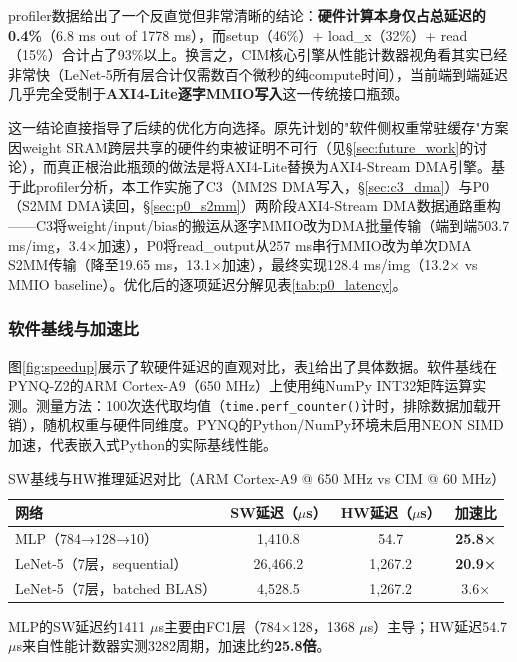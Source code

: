 \documentclass[12pt, a4paper]{article}
\begin{document}
profiler数据给出了一个反直觉但非常清晰的结论：\textbf{硬件计算本身仅占总延迟的0.4\%}（6.8 ms out of 1778 ms），而setup（46\%）+ load\_x（32\%）+ read（15\%）合计占了93\%以上。换言之，CIM核心引擎从性能计数器视角看其实已经非常快（LeNet-5所有层合计仅需数百个微秒的纯compute时间），当前端到端延迟几乎完全受制于\textbf{AXI4-Lite逐字MMIO写入}这一传统接口瓶颈。

这一结论直接指导了后续的优化方向选择。原先计划的"软件侧权重常驻缓存"方案因weight SRAM跨层共享的硬件约束被证明不可行（见§\ref{sec:future_work}的讨论），而真正根治此瓶颈的做法是将AXI4-Lite替换为AXI4-Stream DMA引擎。基于此profiler分析，本工作实施了C3（MM2S DMA写入，§\ref{sec:c3_dma}）与P0（S2MM DMA读回，§\ref{sec:p0_s2mm}）两阶段AXI4-Stream DMA数据通路重构——C3将weight/input/bias的搬运从逐字MMIO改为DMA批量传输（端到端503.7 ms/img，3.4×加速），P0将read\_output从257 ms串行MMIO改为单次DMA S2MM传输（降至19.65 ms，13.1×加速），最终实现128.4 ms/img（13.2× vs MMIO baseline）。优化后的逐项延迟分解见表\ref{tab:p0_latency}。

\subsubsection{软件基线与加速比}

图\ref{fig:speedup}展示了软硬件延迟的直观对比，表\ref{tab:speedup}给出了具体数据。软件基线在PYNQ-Z2的ARM Cortex-A9（650 MHz）上使用纯NumPy INT32矩阵运算实测。测量方法：100次迭代取均值（\texttt{time.perf\_counter()}计时，排除数据加载开销），随机权重与硬件同维度。PYNQ的Python/NumPy环境未启用NEON SIMD加速，代表嵌入式Python的实际基线性能。

\begin{table}[H]
    \centering
    \caption{SW基线与HW推理延迟对比（ARM Cortex-A9 @ 650 MHz vs CIM @ 60 MHz）}
    \begin{tabular}{lccc}
        \toprule
        网络 & SW延迟（$\mu$s） & HW延迟（$\mu$s） & 加速比 \\
        \midrule
        MLP（784→128→10） & 1,410.8 & 54.7 & \textbf{25.8×} \\
        LeNet-5（7层，sequential） & 26,466.2 & 1,267.2 & \textbf{20.9×} \\
        LeNet-5（7层，batched BLAS） & 4,528.5 & 1,267.2 & 3.6× \\
        \bottomrule
    \end{tabular}
    \label{tab:speedup}
\end{table}

MLP的SW延迟约1411 $\mu$s主要由FC1层（784×128，1368 $\mu$s）主导；HW延迟54.7 $\mu$s来自性能计数器实测3282周期，加速比约\textbf{25.8倍}。
\end{document}

